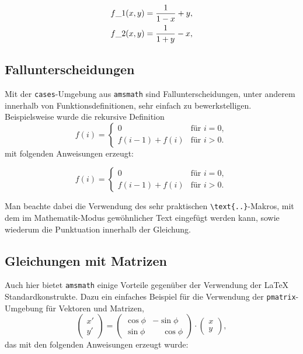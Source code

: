 \begin{align}
  f\_1 (x,y) &= \frac{1}{1-x} + y , \label{eq:f11} \\
  \formelentry{Formel 1}
  f\_2 (x,y) &= \frac{1}{1+y} - x , \label{eq:f21}
  \formelentry{Formel 2}
\end{align}



\subsection{Fallunterscheidungen}

Mit der \texttt{cases}-Umgebung aus \texttt{amsmath} sind Fallunterscheidungen, unter anderem innerhalb von Funktionsdefinitionen, sehr einfach zu bewerkstelligen. Beispielsweise wurde die rekursive Definition
%
\begin{equation}
	f(i) =
	\begin{cases}
	  0             & \text{für $i = 0$},\\
	  f(i-1) + f(i) & \text{für $i > 0$}.
	\end{cases}
\end{equation}
mit folgenden Anweisungen erzeugt:
%

\begin{equation}
	f(i) =
	\begin{cases}
	  0             & \text{für $i = 0$},\\
	  f(i-1) + f(i) & \text{für $i > 0$}.
	\end{cases}
\end{equation}

%
Man beachte dabei die Verwendung des sehr praktischen \verb!\text{..}!-Makros, mit dem im Mathematik-Modus gewöhnlicher Text eingefügt werden kann, sowie wiederum die Punktuation innerhalb der Gleichung.

\subsection{Gleichungen mit Matrizen}

Auch hier bietet \texttt{amsmath} einige Vorteile gegenüber der Verwendung der LaTeX Standardkonstrukte. Dazu ein einfaches Beispiel für die Verwendung der \texttt{pmatrix}-Umgebung für Vektoren und Matrizen,
%
\begin{equation}
	\begin{pmatrix} x' \\ y' \end{pmatrix}
	= 
	\begin{pmatrix}
	  \cos \phi & -\sin \phi \\
	  \sin \phi & \phantom{-}\cos \phi
	\end{pmatrix} 
	\cdot
	\begin{pmatrix}	x \\ y \end{pmatrix} ,
\end{equation}
%
das mit den folgenden Anweisungen erzeugt wurde:
%

